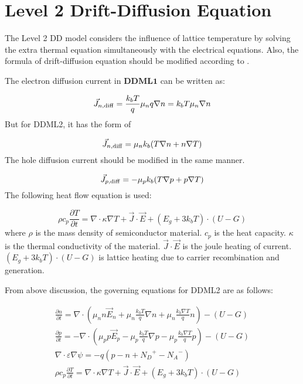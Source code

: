 \documentclass[oneside,12pt]{cgd_book}
\begin{document}
\section{Level 2 Drift-Diffusion Equation}
\label{sec:Equation:DDML2}
The Level 2 DD model considers the influence of lattice temperature by solving the extra thermal
      equation simultaneously with the electrical equations. Also, the formula of drift-diffusion equation should be
      modified according to \cite[Selberherr1984]{}.
\par
{}The electron diffusion current in
$\mathbf{DDML1}$ can be written as:
\par
\begin{equation}
{\vec{J}}_{n,{\rm diff}} = \frac{k_b T}{q}\mu_n q\nabla n = k_b T\mu_n \nabla n
\end{equation}
But for DDML2, it has the form of
\par
\par
\begin{equation}
{\vec{J}}_{n,{\rm diff}} = \mu_n k_b (T\nabla n + n\nabla T)
\end{equation}
The hole diffusion current should be modified in the same manner.
\par
\begin{equation}
{\vec{J}}_{p,{\rm diff}} = -\mu_p k_b (T\nabla p + p\nabla T)
\end{equation}
The following heat flow equation is used:
\par
\par
\begin{equation}
\rho c_p \frac{\partial T}{\partial t} = \nabla \cdot \kappa \nabla T + \vec{J} \cdot \vec{E} + (E_g + 3k_b T) \cdot
        (U - G)
\end{equation}
where $\rho$ is the mass density of semiconductor material. $c_p$
is the heat capacity. $\kappa$ is the thermal conductivity
      of the material. $\vec{J}\cdot\vec{E}$ is the joule heating of current.
$(E_g + 3k_b T) \cdot (U - G)$ is lattice heating due to carrier recombination and
      generation.
\par
From above discussion, the governing equations for DDML2 are as follows:
\par
\begin{subequations}
\begin{align}
 \frac{\partial n}{\partial t}  = \nabla \cdot \left(\mu_n n \vec{E}_n + \mu_n \frac{k_b T}{q}\nabla n + \mu_n
        \frac{k_b \nabla T}{q} n\right) - \left( {U - G} \right) \\
 \frac{\partial p}{\partial t}  = -\nabla \cdot \left(\mu_p p \vec{E}_p - \mu_p \frac{k_b T}{q}\nabla p -
        \mu_p \frac{k_b \nabla T}{q} p\right) - \left( {U - G} \right) \\
 \nabla \cdot \varepsilon \nabla \psi  = - q\left( {p - n + {N_D}^+ - {N_A}^ - } \right)
        \\
 \rho c_p \frac{\partial T}{\partial t}  = \nabla \cdot \kappa \nabla T + \vec{J} \cdot \vec{E} + (E_g + 3k_b
        T) \cdot (U - G)
\end{align}
\end{subequations}
\end{document}
